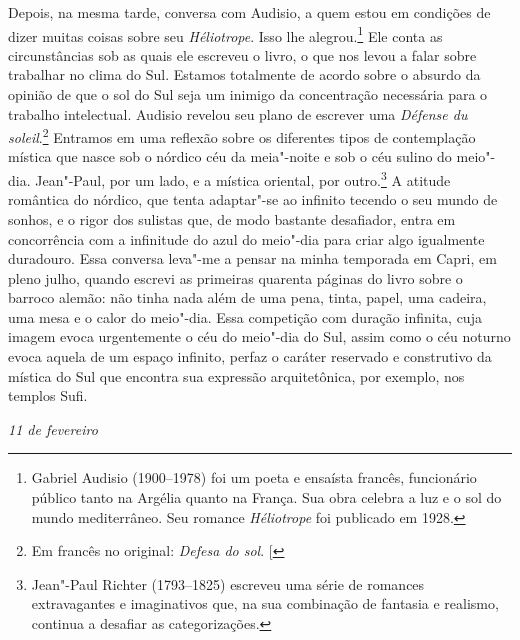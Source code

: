 Depois, na mesma tarde, conversa com Audisio, a quem estou em
condições de dizer muitas coisas sobre seu \emph{Héliotrope}. Isso lhe
alegrou.\footnote{Gabriel Audisio (1900--1978) foi um poeta e ensaísta
  francês, funcionário público tanto na Argélia quanto na França.
  Sua obra celebra a luz e o sol do mundo mediterrâneo. Seu romance
  \emph{Héliotrope} foi publicado em 1928. \versal{[N.~O.]}} Ele conta as circunstâncias
sob as quais ele escreveu o livro, o que nos levou a falar sobre
trabalhar no clima do Sul. Estamos totalmente de acordo sobre o absurdo
da opinião de que o sol do Sul seja um inimigo da concentração
necessária para o trabalho intelectual. Audisio revelou seu plano
de escrever uma \emph{Défense du soleil}.\footnote{Em francês no original: \emph{Defesa do sol}. {[}\versal{N.~T.}{]}} Entramos em uma reflexão sobre os
diferentes tipos de contemplação mística que nasce sob o nórdico céu da
meia"-noite e sob o céu sulino do meio"-dia. Jean"-Paul, por um lado, e a
mística oriental, por outro.\footnote{Jean"-Paul Richter (1793--1825)
  escreveu uma série de romances extravagantes e imaginativos que, na sua
  combinação de fantasia e realismo, continua a desafiar as
  categorizações. \versal{[N.~O.]}} A atitude romântica do nórdico, que tenta adaptar"-se
ao infinito tecendo o seu mundo de sonhos, e o rigor dos sulistas que,
de modo bastante desafiador, entra em concorrência com a infinitude do
azul do meio"-dia para criar algo igualmente duradouro. Essa conversa
leva"-me a pensar na minha temporada em Capri, em pleno julho, quando
escrevi as primeiras quarenta páginas do livro sobre o barroco alemão:
não tinha nada além de uma pena, tinta, papel, uma cadeira, uma mesa e o
calor do meio"-dia. Essa competição com duração infinita, cuja imagem
evoca urgentemente o céu do meio"-dia do Sul, assim como o céu noturno evoca
aquela de um espaço infinito, perfaz o caráter reservado e construtivo
da mística do Sul que encontra sua expressão arquitetônica, por exemplo,
nos templos Sufi.

\begin{flushright}
\emph{11 de fevereiro}
\end{flushright}


